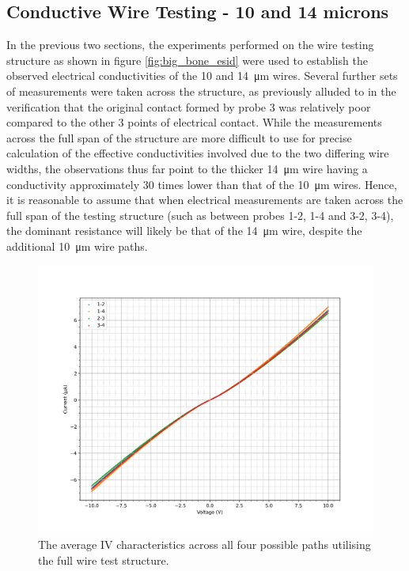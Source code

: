\begin{refsection}
\subsection{Conductive Wire Testing - 10 and 14 microns}
\label{subsubsec:graphitised_wire_testing_both}
In the previous two sections, the experiments performed on the wire testing structure as shown in figure \ref{fig:big_bone_esid} were used to establish the observed electrical conductivities of the 10 and 14~\si{\micro\metre} wires. Several further sets of measurements were taken across the structure, as previously alluded to in the verification that the original contact formed by probe 3 was relatively poor compared to the other 3 points of electrical contact. While the measurements across the full span of the structure are more difficult to use for precise calculation of the effective conductivities involved due to the two differing wire widths, the observations thus far point to the thicker 14~\si{\micro\metre} wire having a conductivity approximately 30 times lower than that of the 10~\si{\micro\metre} wires. Hence, it is reasonable to assume that when electrical measurements are taken across the full span of the testing structure (such as between probes 1-2, 1-4 and 3-2, 3-4), the dominant resistance will likely be that of the 14~\si{\micro\metre} wire, despite the additional 10~\si{\micro\metre} wire paths.

\begin{figure}[H]
    \centering
    \includegraphics[width=\linewidth]{Chapter7/Figs/Raster/cross iv.png}
    \caption{The average IV characteristics across all four possible paths utilising the full wire test structure.}
    \label{fig:10v_big_bone}
\end{figure}


\end{refsection}
